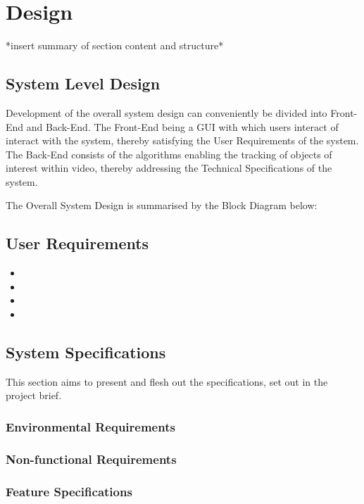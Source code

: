 \chapter{Design}\label{design}
*insert summary of section content and structure*

\section{System Level Design}
Development of the overall system design can conveniently be divided into
Front-End and Back-End. The Front-End being a GUI with which users interact 
of interact with the system, thereby satisfying the User Requirements of the
system.
The Back-End consists of the algorithms enabling the tracking of objects of
interest within video, thereby addressing the Technical Specifications of the
system.

The Overall System Design is summarised by the Block Diagram below: 


\section{User Requirements}
\begin{itemize}
    \item
    \item
    \item
    \item
\end{itemize}

\section{System Specifications}
This section aims to present and flesh out the specifications, set out in the
project brief.


\subsection{Environmental Requirements}

\subsection{Non-functional Requirements}

\subsection{Feature Specifications}

